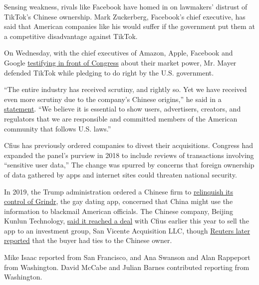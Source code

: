 Sensing weakness, rivals like Facebook have homed in on lawmakers'
distrust of TikTok's Chinese ownership. Mark Zuckerberg, Facebook's
chief executive, has said that American companies like his would suffer
if the government put them at a competitive disadvantage against TikTok.

On Wednesday, with the chief executives of Amazon, Apple, Facebook and
Google
\href{https://www.nytimes3xbfgragh.onion/2020/07/29/technology/big-tech-hearing-apple-amazon-facebook-google.html}{testifying
in front of Congress} about their market power, Mr. Mayer defended
TikTok while pledging to do right by the U.S. government.

``The entire industry has received scrutiny, and rightly so. Yet we have
received even more scrutiny due to the company's Chinese origins,'' he
said in a
\href{https://newsroom.tiktok.com/en-us/fair-competition-and-transparency-benefits-us-all}{statement}.
``We believe it is essential to show users, advertisers, creators, and
regulators that we are responsible and committed members of the American
community that follows U.S. laws.''

Cfius has previously ordered companies to divest their acquisitions.
Congress had expanded the panel's purview in 2018 to include reviews of
transactions involving ``sensitive user data,'' The change was spurred
by concerns that foreign ownership of data gathered by apps and internet
sites could threaten national security.

In 2019, the Trump administration ordered a Chinese firm to
\href{https://www.nytimes3xbfgragh.onion/2019/03/28/us/politics/grindr-china-national-security.html}{relinquish
its control of Grindr}, the gay dating app, concerned that China might
use the information to blackmail American officials. The Chinese
company, Beijing Kunlun Technology,
\href{https://www.reuters.com/article/us-grindr-m-a-investors-exclusive/exclusive-grindrs-chinese-owner-nears-deal-to-sell-gay-dating-app-sources-idUSKBN20T0IR}{said
it reached a deal} with Cfius earlier this year to sell the app to an
investment group, San Vicente Acquisition LLC, though
\href{https://www.reuters.com/article/us-grindr-m-a-sanvicente-exclusive/exclusive-winning-bidder-for-grindr-has-ties-to-chinese-owner-idUSKBN2391AI}{Reuters
later reported} that the buyer had ties to the Chinese owner.

Mike Isaac reported from San Francisco, and Ana Swanson and Alan
Rappeport from Washington. David McCabe and Julian Barnes contributed
reporting from Washington.

